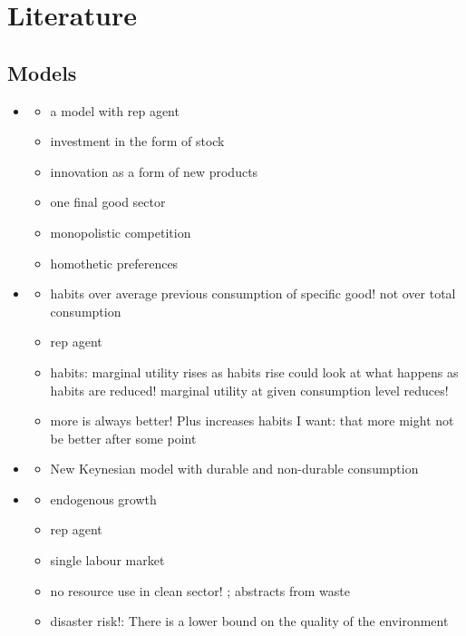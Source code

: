 \section{Literature}


\subsection{Models}
\begin{itemize}
\item \cite{Bilbiie2012EndogenousCycles}
\begin{itemize}
\item a model with rep agent
\item investment in the form of stock 
\item innovation as a form of new products
\item one final good sector
\item monopolistic competition
\item homothetic preferences
\end{itemize}
\item \cite{Ravn2006DeepHabits}
\begin{itemize}
 \item habits over average previous consumption of specific good! not over total consumption
 \item rep agent 
 \item habits: marginal utility rises as habits rise \ar could look at what happens as habits are reduced! \ar marginal utility at given consumption level reduces!
 \item more is always better! Plus increases habits \ar I want: that more might not be better after some point
\end{itemize}
\item \cite{McKay2021LumpyPolicy}
\begin{itemize}
\item New Keynesian model with durable and non-durable consumption 
\end{itemize}
\item \cite{Acemoglu2012TheChange}
\begin{itemize}
\item endogenous growth
\item rep agent
\item single labour market
\item no resource use in clean sector! ; abstracts from waste
\item disaster risk!: There is a lower bound on the quality of the environment 

\end{itemize}
\end{itemize}
